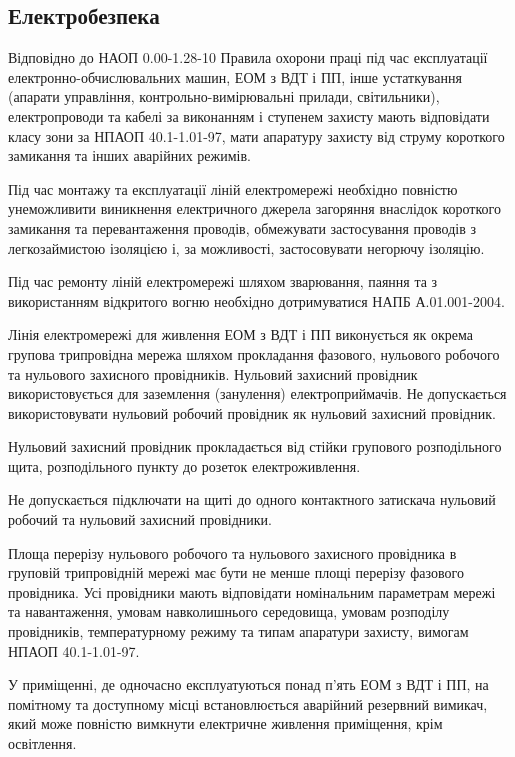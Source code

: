 \subsection{Електробезпека}

Відповідно до НАОП 0.00-1.28-10 Правила охорони праці під час експлуатації електронно-обчислювальних машин, ЕОМ з ВДТ і ПП, інше устаткування (апарати управління, контрольно-вимірювальні прилади, світильники), електропроводи та кабелі за виконанням і ступенем захисту мають відповідати класу зони за НПАОП 40.1-1.01-97, мати апаратуру захисту від струму короткого замикання та інших аварійних режимів.

Під час монтажу та експлуатації ліній електромережі необхідно повністю унеможливити виникнення електричного джерела загоряння внаслідок короткого замикання та перевантаження проводів, обмежувати застосування проводів з легкозаймистою ізоляцією і, за можливості, застосовувати негорючу ізоляцію.

Під час ремонту ліній електромережі шляхом зварювання, паяння та з використанням відкритого вогню необхідно дотримуватися НАПБ А.01.001-2004.

Лінія електромережі для живлення ЕОМ з ВДТ і ПП виконується як окрема групова трипровідна мережа шляхом прокладання фазового, нульового робочого та нульового захисного провідників. Нульовий захисний провідник використовується для заземлення (занулення) електроприймачів.
Не допускається використовувати нульовий робочий провідник як нульовий захисний провідник.

Нульовий захисний провідник прокладається від стійки групового розподільного щита, розподільного пункту до розеток електроживлення.

Не допускається підключати на щиті до одного контактного затискача нульовий робочий та нульовий захисний провідники.

Площа перерізу нульового робочого та нульового захисного провідника в груповій трипровідній мережі має бути не менше площі перерізу фазового провідника. Усі провідники мають відповідати номінальним параметрам мережі та навантаження, умовам навколишнього середовища, умовам розподілу провідників, температурному режиму та типам апаратури захисту, вимогам НПАОП 40.1-1.01-97.

У приміщенні, де одночасно експлуатуються понад п'ять ЕОМ з ВДТ і ПП, на помітному та доступному місці встановлюється аварійний резервний вимикач, який може повністю вимкнути електричне живлення приміщення, крім освітлення.

